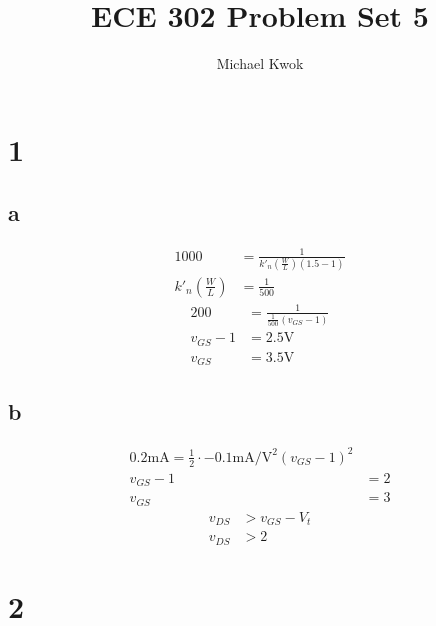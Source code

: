 \documentclass{article}
\title{ECE 302 Problem Set 5}
\author{Michael Kwok}
\begin{document}
\maketitle
\begin{multicols}{2}
    \section*{1}
    \subsection*{a}
    \begin{align*}
        1000                          & = \frac{1}{k'_n \left(\frac{W}{L}\right)\left(1.5-1\right)} \\
        k'_n \left(\frac{W}{L}\right) & = \frac{1}{500}
    \end{align*}
    \begin{align*}
        200      & = \frac{1}{\frac{1}{500}\left(v_{GS} - 1\right)} \\
        v_{GS}-1 & = 2.5 \si{\volt}                                 \\
        v_{GS}   & = 3.5 \si{\volt}
    \end{align*}
    \subsection*{b}
    \begin{align*}
        0.2 \si{\milli\ampere} = \frac{1}{2} \cdot -0.1 \si{\milli\ampere\per\volt\squared} {\left(v_{GS} - 1\right)}^2 \\
        v_{GS} - 1 & = 2                                                                                                \\
        v_{GS}     & = 3
    \end{align*}
    \begin{align*}
        v_{DS} & > v_{GS} - V_t \\
        v_{DS} & > 2
    \end{align*}
    \section*{2}

\end{multicols}
\end{document}
